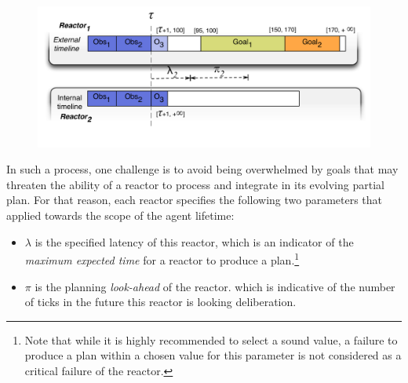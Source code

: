 \begin{figure}[b]
  \centering
  \includegraphics[scale=0.45]{figs/token-disptch.pdf}
  \caption{\small {}}
  \label{fig:reactor-lookahead}
\end{figure}

In such a process, one challenge is to avoid being overwhelmed by
goals that may threaten the ability of a reactor to process and
integrate in its evolving partial plan. For that reason, each reactor
specifies the following two parameters that  applied
towards the scope of the agent lifetime:

\begin{itemize}

\item $\lambda$ is the specified latency of this reactor, which is an
  indicator of the \emph{maximum expected time} for a reactor to
  produce a plan.\footnote{Note that while it is highly recommended to
    select a sound value, a failure to produce a plan within a chosen
    value for this parameter is not considered as a critical failure
    of the reactor.}

\item $\pi$ is the planning \emph{look-ahead} of the reactor. which is
  indicative of the number of ticks in the future this reactor is
  looking  deliberation.

\end{itemize}

